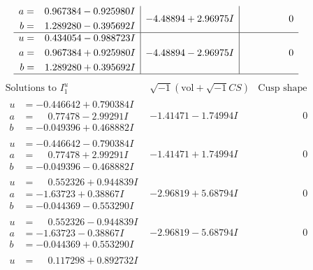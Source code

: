 \documentclass[1p]{elsarticle_modified}
\theoremstyle{definition}
\newcommand{\I}{\sqrt{-1}}
\begin{document}
$$\begin{array}{c|c|c}
\begin{aligned}
a &= \phantom{-}0.967384 - 0.925980 I \\
b &= \phantom{-}1.289280 - 0.395692 I\end{aligned}
 & -4.48894 + 2.96975 I & \phantom{-0.000000 } 0 \\ \hline\begin{aligned}
u &= \phantom{-}0.434054 - 0.988723 I \\
a &= \phantom{-}0.967384 + 0.925980 I \\
b &= \phantom{-}1.289280 + 0.395692 I\end{aligned}
 & -4.48894 - 2.96975 I & \phantom{-0.000000 } 0\\
 \hline 
 \end{array}$$\newpage$$\begin{array}{c|c|c}  
\text{Solutions to }I^u_{1}& \I (\text{vol} + \sqrt{-1}CS) & \text{Cusp shape}\\
 \hline 
\begin{aligned}
u &= -0.446642 + 0.790384 I \\
a &= \phantom{-}0.77478 - 2.99291 I \\
b &= -0.049396 + 0.468882 I\end{aligned}
 & -1.41471 - 1.74994 I & \phantom{-0.000000 } 0 \\ \hline\begin{aligned}
u &= -0.446642 - 0.790384 I \\
a &= \phantom{-}0.77478 + 2.99291 I \\
b &= -0.049396 - 0.468882 I\end{aligned}
 & -1.41471 + 1.74994 I & \phantom{-0.000000 } 0 \\ \hline\begin{aligned}
u &= \phantom{-}0.552326 + 0.944839 I \\
a &= -1.63723 + 0.38867 I \\
b &= -0.044369 - 0.553290 I\end{aligned}
 & -2.96819 + 5.68794 I & \phantom{-0.000000 } 0 \\ \hline\begin{aligned}
u &= \phantom{-}0.552326 - 0.944839 I \\
a &= -1.63723 - 0.38867 I \\
b &= -0.044369 + 0.553290 I\end{aligned}
 & -2.96819 - 5.68794 I & \phantom{-0.000000 } 0 \\ \hline\begin{aligned}
u &= \phantom{-}0.117298 + 0.892732 I \\

\end{aligned}
\end{array}$$
\end{document}
